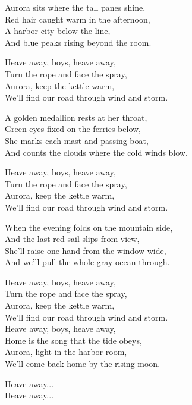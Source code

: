 \begin{lyrics}
Aurora sits where the tall panes shine,\\
Red hair caught warm in the afternoon,\\
A harbor city below the line,\\
And blue peaks rising beyond the room.

Heave away, boys, heave away,\\
Turn the rope and face the spray,\\
Aurora, keep the kettle warm,\\
We’ll find our road through wind and storm.

A golden medallion rests at her throat,\\
Green eyes fixed on the ferries below,\\
She marks each mast and passing boat,\\
And counts the clouds where the cold winds blow.

Heave away, boys, heave away,\\
Turn the rope and face the spray,\\
Aurora, keep the kettle warm,\\
We’ll find our road through wind and storm.

When the evening folds on the mountain side,\\
And the last red sail slips from view,\\
She’ll raise one hand from the window wide,\\
And we’ll pull the whole gray ocean through.

Heave away, boys, heave away,\\
Turn the rope and face the spray,\\
Aurora, keep the kettle warm,\\
We’ll find our road through wind and storm.\\
Heave away, boys, heave away,\\
Home is the song that the tide obeys,\\
Aurora, light in the harbor room,\\
We’ll come back home by the rising moon.

Heave away...\\
Heave away...
\end{lyrics}

